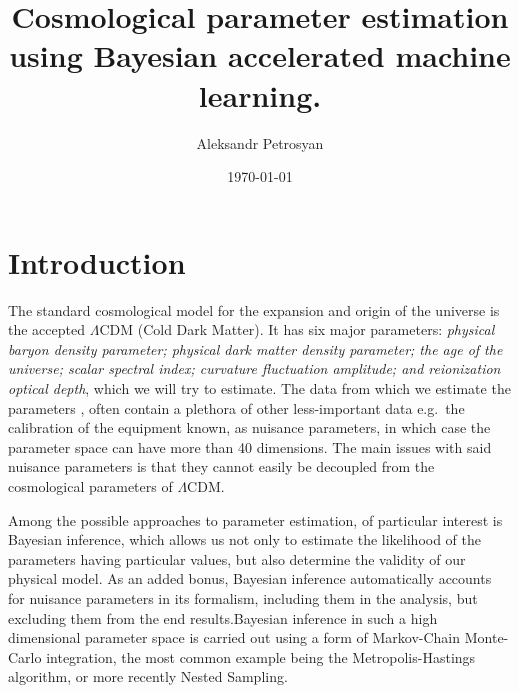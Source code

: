 \documentclass[12pt]{article}
\author{Aleksandr Petrosyan}
\date{\today}
\title{Cosmological parameter estimation using Bayesian accelerated machine learning.}
\begin{document}
\renewcommand*{\bibfont}{\small}

\maketitle
{}

\vspace{0.9in}
\section{Introduction}\label{sec:introduction}

The standard cosmological model for the expansion and origin of the
universe is the accepted $\Lambda$CDM\autocite{Condon2018} (Cold Dark
Matter). It has six major parameters: \emph{physical baryon density
  parameter; physical dark matter density parameter; the age of the
  universe; scalar spectral index; curvature fluctuation amplitude;
  and reionization optical depth}, which we will try to estimate. The
data from which we estimate the parameters \autocite[See. ]{planck},
often contain a plethora of other less-important data e.g.~the
calibration of the equipment known, as nuisance parameters, in which
case the parameter space can have more than 40 dimensions. The main
issues with said nuisance parameters is that they cannot easily be
decoupled from the cosmological parameters of $\Lambda$CDM.

Among the possible approaches to parameter estimation, of particular
interest is Bayesian inference, which allows us not only to estimate
the likelihood of the parameters having particular values, but also
determine the validity of our physical model. As an added bonus,
Bayesian inference automatically accounts for nuisance parameters in
its formalism, including them in the analysis, but excluding them from
the end results.Bayesian inference in such a high dimensional
parameter space is carried out using a form of Markov-Chain
Monte-Carlo integration, the most common example being the
Metropolis-Hastings algorithm\autocite{Metropolis}, or more recently
Nested Sampling\autocite{polychord,skilling2006}.
\end{document}

